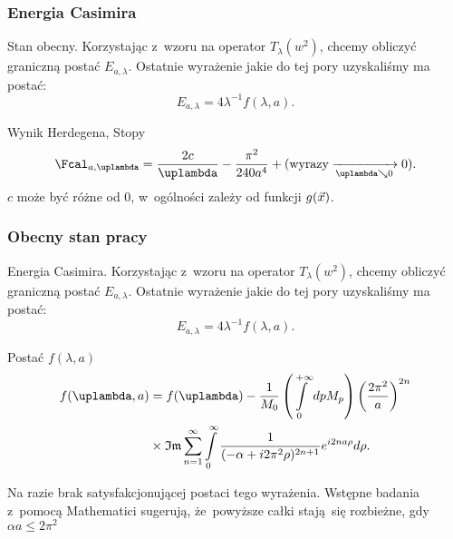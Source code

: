 \documentclass[10pt,t]{beamer}
\begin{document}
\begin{frame}
  \frametitle{Energia Casimira}


  Stan obecny. Korzystając z~wzoru na operator $T_{ \lambda }( w^{ 2 } )$, chcemy
  obliczyć graniczną postać $E_{ a, \lambda }$. Ostatnie wyrażenie jakie do tej
  pory uzyskaliśmy ma postać:
  \begin{equation}
    \label{eq:Efekt-Casimira-37}
    E_{ a, \lambda } = 4 \lambda^{ -1 } f( \lambda, a ).
  \end{equation}

  Wynik Herdegena, Stopy
  \begin{equation}
    \label{eq:Efekt-Casimira-38}
    \Fcal_{ a, \lambda } =
    \frac{ 2 c }{ \lambda } - \frac{ \pi^{ 2 } }{ 240 a^{ 4 } }
    + ( \textrm{wyrazy} \xrightarrow[ \lambda \searrow 0 ]{} 0 ).
  \end{equation}
  $c$ może być różne od 0, w~ogólności zależy od funkcji
  $g( \vec{ x } )$.

\end{frame}





\begin{frame}
  \frametitle{Obecny stan pracy}


  Energia Casimira. Korzystając z~wzoru na operator $T_{ \lambda }( w^{ 2 } )$,
  chcemy obliczyć graniczną postać $E_{ a, \lambda }$. Ostatnie wyrażenie jakie
  do tej pory uzyskaliśmy ma postać:
  \begin{equation}
    \label{eq:Efekt-Casimira-39}
    E_{ a, \lambda } = 4 \lambda^{ -1 } f( \lambda, a ).
  \end{equation}


  Postać $f( \lambda, a )$
  \begin{equation}
    \label{eq:Efekt-Casimira-40}
    \begin{split}
      f( \lambda, a )
      &=
        f( \lambda )
        - \frac{ 1 }{ M_{ 0 } }
        \left( \int\limits_{ 0 }^{ +\infty } dp M_{ p } \right)
        \left( \frac{ 2 \pi^{ 2 } }{ a } \right)^{ 2 n } \\
      &\times \Imag \sum\limits_{ n = 1 }^{ \infty } \int\limits_{ 0 }^{ \infty }
        \frac{ 1 }{ ( -\alpha + i 2 \pi^{ 2 } \rho )^{ 2n + 1 } }
        e^{ i 2 na \rho } d\rho.
      \end{split}
    \end{equation}

    Na razie brak satysfakcjonującej postaci tego wyrażenia. Wstępne
    badania z~pomocą Mathematici sugerują, że~powyższe całki
    stają~się rozbieżne, gdy $\alpha a \leq 2 \pi^{ 2 }$

\end{frame}
\end{document}
